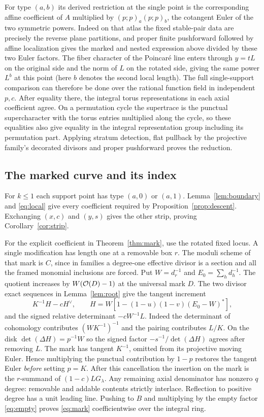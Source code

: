 For type $(a,b)$ its derived restriction at the single point is the corresponding affine coefficient of $A$ multiplied by $(p;p)_a(p;p)_b$, the cotangent Euler of the two symmetric powers. Indeed on that atlas the fixed stable-pair data are precisely the reverse plane partitions, and proper finite pushforward followed by affine localization gives the marked and nested expression above divided by these two Euler factors. The fiber character of the Poincar\'e line enters through $y=tL$ on the original side and the norm of $L$ on the rotated side, giving the same power $L^b$ at this point (here $b$ denotes the second local length). The full single-support comparison can therefore be done over the rational function field in independent $p,c$. After equality there, the integral torus representations in each axial coefficient agree. On a permutation cycle the supertrace is the punctual supercharacter with the torus entries multiplied along the cycle, so these equalities also give equality in the integral representation group including its permutation part. Applying stratum detection, flat pullback by the projective family's decorated divisors and proper pushforward proves the reduction.

\subsection{The marked curve and its index}
For $k\le1$ each support point has type $(a,0)$ or $(a,1)$.
Lemma~\ref{lem:boundary} and \eqref{eq:local} give every coefficient
required by Proposition~\ref{prop:descent}. Exchanging $(x,c)$
and $(y,s)$ gives the other strip, proving Corollary~\ref{cor:strip}.

For the explicit coefficient in Theorem~\ref{thm:mark}, use the
rotated fixed locus. A single modification has length one at a
removable box $r$. The moduli scheme of that mark is $C$, since
in families a degree-one effective divisor is a section and all the
framed monomial inclusions are forced. Put $W=d_r^{-1}$ and
$E_0=\sum_h d_h^{-1}$. The quotient increases by
$W(\mathcal O(D)-1)$ at the universal mark $D$. The two divisor exact
sequences in Lemma~\ref{lem:root} give the tangent increment
\[
 K^{-1}H-cH^\vee,\qquad H=W[1-(1-u)(1-v)(E_0-W)^*],
\]
and the signed relative determinant $-cW^{-1}L$. Indeed the
determinant of cohomology contributes $(WK^{-1})^{-1}$ and the
pairing contributes $L/K$. On the disk $\det(\Delta H)=p^{-1}W$
so the signed factor $-s^{-1}/\det(\Delta H)$ agrees after removing
$L$. The mark has tangent $K^{-1}$, omitted from its projective
moving Euler. Hence multiplying the punctual contribution by
$1-p$ restores the tangent Euler \emph{before} setting $p=K$.
After this cancellation the insertion on the mark is the
$r$-summand of $(1-c)LG_\lambda$. Any remaining axial denominator
has nonzero $q$ degree: removable and addable contents strictly
interlace. Reflection to positive degree has a unit leading line.
Pushing to $B$ and multiplying by the empty factor \eqref{eq:empty}
proves \eqref{eq:mark} coefficientwise over the integral ring.


